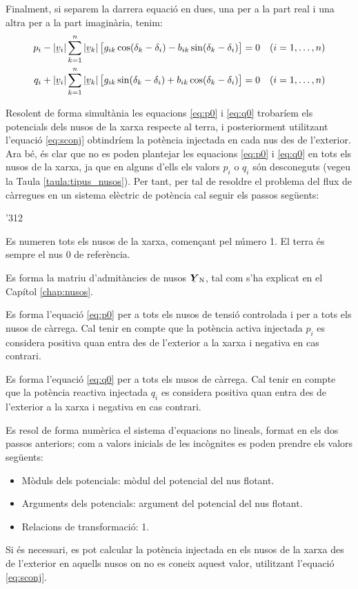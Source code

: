 Finalment, si separem la darrera equació en dues, una per a  la part real i  una altra per
a la part imaginària, tenim:
\begin{align}
    p_i - |\cmplx{v}_i| \sum^n_{k=1}  |\cmplx{v}_k|\, \bigl[ g_{ik} \cos(\delta_k - \delta_i) -
     b_{ik} \sin(\delta_k - \delta_i) \bigr] &= 0  & (i&=1,\ldots,n)\label{eq:p0} \\
    q_i + |\cmplx{v}_i| \sum^n_{k=1}  |\cmplx{v}_k| \,\bigl[ g_{ik} \sin(\delta_k - \delta_i) +
      b_{ik} \cos(\delta_k - \delta_i) \bigr] &= 0 & (i&=1,\ldots,n)\label{eq:q0}
\end{align}

Resolent de forma simultània les equacions \eqref{eq:p0} i
\eqref{eq:q0} trobaríem els potencials dels nusos de la xarxa
respecte al terra, i posteriorment utilitzant l'equació
\eqref{eq:sconj} obtindríem la potència injectada en cada nus des
de l'exterior. Ara bé, és clar que no es poden plantejar les
equacions \eqref{eq:p0} i \eqref{eq:q0} en tots els nusos de la
xarxa, ja que en alguns d'ells els valors $p_i$ o $q_i$ són
desconeguts (vegeu la Taula \vref{taula:tipus_nusos}). Per tant, per
tal de resoldre el problema del flux de càrregues en un sistema
elèctric de potència cal seguir els passos següents:
\begin{dingautolist}{'312}
    \item Es numeren tots els nusos de la xarxa, començant pel número 1. El terra és sempre el nus 0 de referència.
   \item Es forma la matriu d'admitàncies de nusos $\mcmplx{Y}\ped{N}$, tal com s'ha
   explicat en el Capítol \ref{chap:nusos}.
   \item Es forma l'equació \eqref{eq:p0} per a tots els nusos de tensió controlada i per
   a tots els nusos de càrrega. Cal tenir en compte que la potència activa  injectada $p_i$ es considera
   positiva quan entra des de l'exterior a la xarxa i negativa en cas contrari.
   \item Es forma l'equació \eqref{eq:q0} per a tots els nusos de càrrega. Cal tenir en compte
   que la potència reactiva injectada $q_i$  es considera positiva quan entra des de l'exterior a la xarxa i negativa en cas contrari.
   \item Es resol de forma numèrica el sistema d'equacions no lineals, format en els dos
   passos anteriors; com a valors inicials de les incògnites es poden prendre els valors
   següents:
   \begin{itemize}
    \item Mòduls dels potencials: mòdul del potencial del nus flotant.
    \item Arguments dels potencials: argument del potencial del nus flotant.
    \item Relacions de transformació: 1.
   \end{itemize}
   \item Si és necessari,  es pot calcular la potència injectada en els nusos de la xarxa
   des de l'exterior en aquells nusos on no es
   coneix aquest valor, utilitzant    l'equació \eqref{eq:sconj}.
\end{dingautolist}


